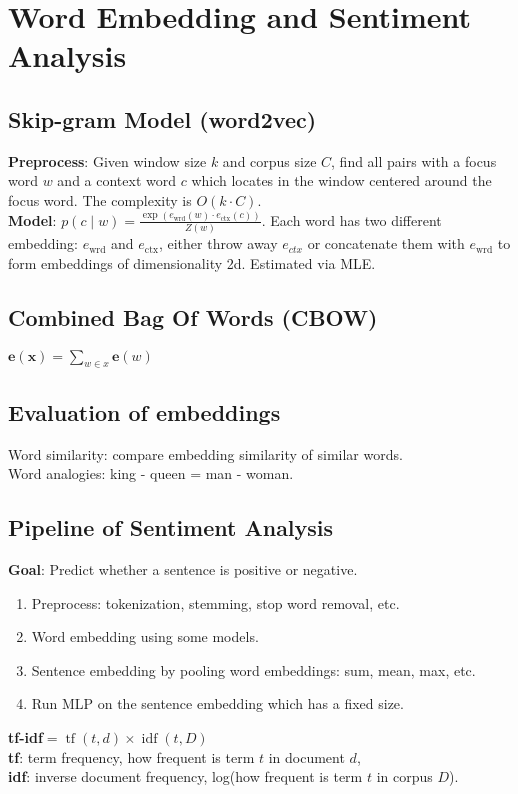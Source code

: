 \section{Word Embedding and Sentiment Analysis}

\subsection*{Skip-gram Model (word2vec)}
\textbf{Preprocess}: Given window size $k$ and corpus size $C$, find all pairs with a focus word $w$ and a context word $c$ which locates in the window centered around the focus word. The complexity is $O(k\cdot C)$.\\
\textbf{Model}: $p(c\mid w)=\frac{\exp(e_{\text{wrd}}(w)\cdot e_{\text{ctx}}(c))}{Z(w)}$. Each word has two different embedding: $e_{\text{wrd}}$ and $e_{\text{ctx}}$, either throw away $e_{ctx}$ or concatenate them with $e_{\text{wrd}}$ to form embeddings of dimensionality 2d. Estimated via MLE.

\subsection*{Combined Bag Of Words (CBOW)}
$\mathbf{e}(\mathbf{x})=\sum_{w \in x} \mathbf{e}(w)$

\subsection*{Evaluation of embeddings}
Word similarity: compare embedding similarity of similar words. \\
Word analogies: king - queen = man - woman.

\subsection*{Pipeline of Sentiment Analysis}
\textbf{Goal}: Predict whether a sentence is positive or negative.
\begin{enumerate}
    \item Preprocess: tokenization, stemming, stop word removal, etc.
    \item Word embedding using some models.
    \item Sentence embedding by pooling word embeddings: sum, mean, max, etc.
    \item Run MLP on the sentence embedding which has a fixed size.
\end{enumerate}

\textbf{tf-idf}$=\operatorname{tf}(t, d) \times \operatorname{idf}(t, D)$ \\
\textbf{tf}: term frequency, how frequent is term $t$ in document $d$, \\ 
\textbf{idf}: inverse document frequency, log(how frequent is term $t$ in corpus $D$).
